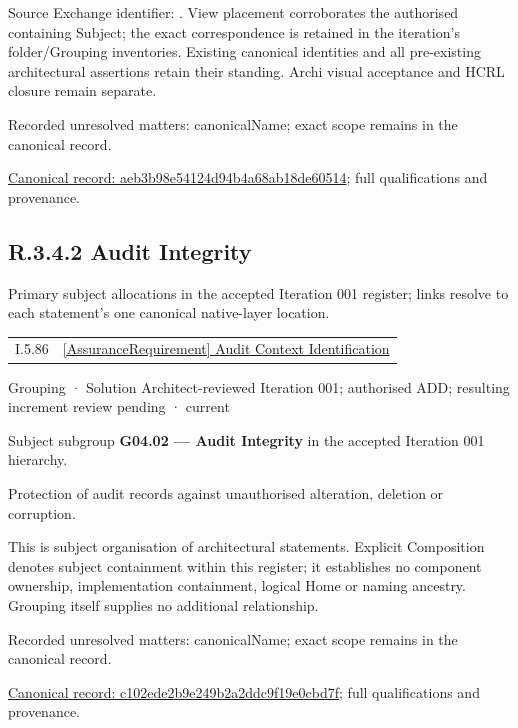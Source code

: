 Source Exchange identifier: \texttt{}. View placement corroborates
the authorised containing Subject; the exact correspondence is retained in the
iteration's folder/Grouping inventories. Existing canonical identities and all
pre-existing architectural assertions retain their standing. Archi visual
acceptance and HCRL closure remain separate.


{\small Recorded unresolved matters: canonicalName; exact scope remains in the canonical record.}\par
{\footnotesize \href{../../../../continuum/grouping/aeb3b98e54124d94b4a68ab18de60514.md}{Canonical record: aeb3b98e54124d94b4a68ab18de60514}; full qualifications and provenance.}\par
\subsection*{R.3.4.2 Audit Integrity}
\label{navigation:R.3.4.2}

Primary subject allocations in the accepted Iteration 001 register; links resolve to each statement’s one canonical native-layer location.\par
\begin{longtable}{p{.22\linewidth}p{.73\linewidth}}
I.5.86 & \hyperref[element:de466c998be34fae87a2be41983cbcdd]{[AssuranceRequirement] Audit Context Identification} \\
\end{longtable}
\label{element:c102ede2b9e249b2a2ddc9f19e0cbd7f}
{\small Grouping · Solution Architect-reviewed Iteration 001; authorised ADD; resulting increment review pending · current}\par

Subject subgroup \textbf{G04.02 — Audit Integrity} in the accepted Iteration 001 hierarchy.



Protection of audit records against unauthorised alteration, deletion or corruption.



This is subject organisation of architectural statements. Explicit Composition denotes subject containment within this register; it establishes no component ownership, implementation containment, logical Home or naming ancestry. Grouping itself supplies no additional relationship.


{\small Recorded unresolved matters: canonicalName; exact scope remains in the canonical record.}\par
{\footnotesize \href{../../../../continuum/grouping/c102ede2b9e249b2a2ddc9f19e0cbd7f.md}{Canonical record: c102ede2b9e249b2a2ddc9f19e0cbd7f}; full qualifications and provenance.}\par
